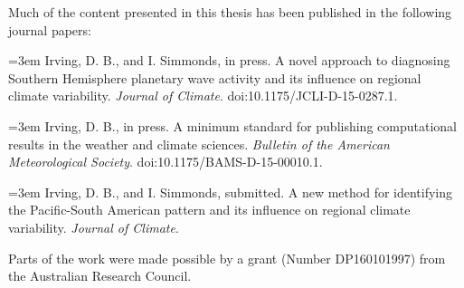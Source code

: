
\begin{preface}

Much of the content presented in this thesis has been published in the following journal papers:

\vspace{5mm}
\hangindent=3em
Irving, D. B., and I. Simmonds, in press. A novel approach to diagnosing Southern Hemisphere planetary wave activity and its influence on regional climate variability. \textit{Journal of Climate}. doi:10.1175/JCLI-D-15-0287.1.

\vspace{5mm}
\hangindent=3em
Irving, D. B., in press. A minimum standard for publishing computational results in the weather and climate sciences. \textit{Bulletin of the American Meteorological Society}. doi:10.1175/BAMS-D-15-00010.1.

\vspace{5mm}
\hangindent=3em
Irving, D. B., and I. Simmonds, submitted. A new method for identifying the Pacific-South American pattern and its influence on regional climate variability. \textit{Journal of Climate}.

\vspace{5mm}
\noindent Parts of the work were made possible by a grant (Number DP160101997) from the Australian Research Council. 

\end{preface}

